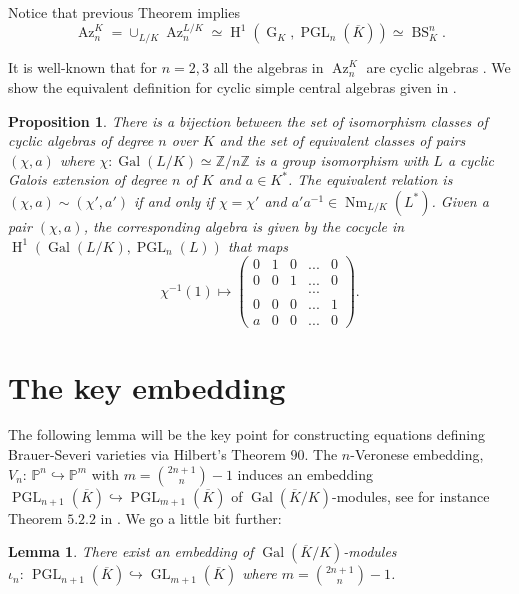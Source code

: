 \documentclass[a4paper,10pt]{amsart}
\theoremstyle{plain}
\newtheorem{proposition}[theorem]{Proposition}
\newtheorem{lemma}[theorem]{Lemma}
\theoremstyle{definition}
\theoremstyle{remark}
\numberwithin{equation}{section}
\begin{document}
Notice that previous Theorem implies $$\operatorname{Az}_{n}^{K}=\cup_{L/K}\operatorname{Az}_{n}^{L/K}\simeq\operatorname{H}^1(\operatorname{G}_K,\operatorname{PGL}_n(\overline{K}))\simeq\operatorname{BS}^n_K.$$

It is well-known that for $n=2,3$ all the algebras in $\operatorname{Az}_{n}^{K}$ are cyclic algebras \cite{Wed}. We show the equivalent definition for cyclic simple central algebras given in \cite{GilSza}. 

\begin{proposition}\label{prop-cyclic}There is a bijection between the set of isomorphism classes of cyclic algebras of degree $n$ over $K$  and the set of equivalent classes of pairs $(\chi,a)$ where $\chi:\operatorname{Gal}(L/K)\simeq\mathbb{Z}/n\mathbb{Z}$ is a group isomorphism with $L$ a cyclic Galois extension of degree $n$ of $K$ and $a\in K^{*}$. The equivalent relation is $(\chi,a)\sim(\chi',a')$ if and only if $\chi=\chi'$ and $a'a^{-1}\in \operatorname{Nm}_{L/K}(L^{*})$. Given a pair $(\chi,a)$, the corresponding algebra is given by the cocycle in $\operatorname{H}^1(\operatorname{Gal}(L/K),\operatorname{PGL}_n(L))$ that maps
\small{
$$
\chi^{-1} (1)\mapsto\begin{pmatrix}
0 & 1 & 0 &... & 0\\
0 & 0 & 1 &... & 0\\
  &   &   &... &  \\
0 & 0 & 0 &... & 1\\
a & 0 & 0 &... & 0 
\end{pmatrix}.
$$}
\end{proposition}

\section{The key embedding}
The following lemma will be the key point for constructing equations defining Brauer-Severi varieties via Hilbert's Theorem $90$. The $n$-Veronese embedding,  $V_n:\,\mathbb{P}^n\hookrightarrow\mathbb{P}^{m}$ with $m=\binom{2n+1}{n}-1$ induces an  embedding $\operatorname{PGL}_{n+1}(\overline{K})\hookrightarrow\operatorname{PGL}_{m+1}(\overline{K})$ of $\operatorname{Gal}(\overline{K}/K)$-modules, see for instance Theorem $5.2.2$ in \cite{GilSza}. We go a little bit further:

\begin{lemma}\label{lemma_key} There exist an embedding of $\operatorname{Gal}(\overline{K}/K)$-modules $\iota_n:\,\operatorname{PGL}_{n+1}(\overline{K})\hookrightarrow\operatorname{GL}_{m+1}(\overline{K})$ where $m=\binom{2n+1}{n}-1$.
\end{lemma}
\end{document}
